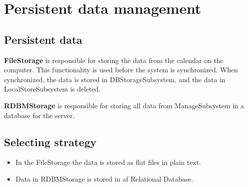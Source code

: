\section{Persistent data management}
\subsection{Persistent data}

\textbf {FileStorage} is responsible for storing the data from the calendar on the computer. This functionality is used before the system is synchronized. When synchronized, the data is stored in DBStorageSubsystem, and the data in LocalStoreSubsystem is deleted. 

\textbf{RDBMStorage} is responsible for storing all data from ManageSubsystem in a database for the server. 


\subsection*{Selecting strategy}
\begin{itemize}
	\item In the FileStorage the data is stored as flat files in plain text. 
	\item Data in RDBMStorage is stored in af Relational Database. 
\end{itemize}